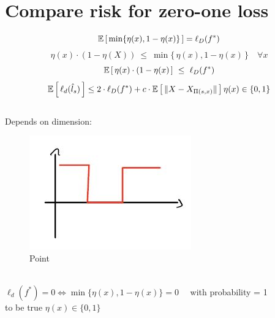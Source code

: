 \documentclass[../main.tex]{subfiles}
\begin{document}
\section{Compare risk for zero-one loss}
$$
\mathbb{E}\left[\, \min\{\eta(x),1-\eta(x)\} \, \right] = \ell_D (f^*) $$
$$
\eta(x) \cdot( 1- \eta(X)) \ \leq \ \min\{ \,\eta(x), 1-\eta(x)\, \} \quad \forall x
$$
$$
\mathbb{E}\left[\, \eta(x)\cdot(1-\eta(x)\, \right] \ \leq  \ \ell_D(f^*)
$$
$$
\mathbb{E}\left[\, \ell_d(\hat{l}_s)\, \right] \leq 2 \cdot \ell_D(f^*) + c \cdot \mathbb{E}\left[\, \|X-X_{\Pi(s,x)}\| \, \right]
\\\\
\eta(x) \in \{0,1\}
$$
\\
Depends on dimension: 
\\
\begin{figure}[h]
    \centering
    \includegraphics[width=0.6\linewidth]{../img/lez10-img2.JPG}
    \caption{Point}
\end{figure}\\
$
\ell_d(f^*) = 0 \iff \min\{ \eta(x), 1-\eta(x)\} =0 \quad$ with probability = 1
\\
to be true $\eta(x) \in \{0,1\}$
\end{document}

